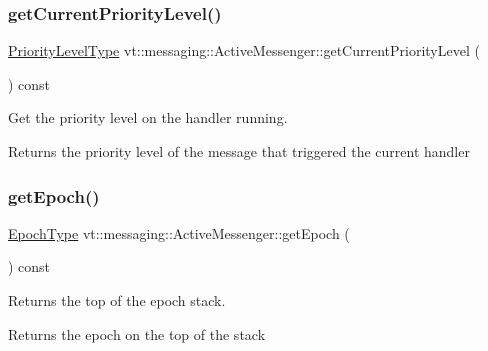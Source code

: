 \subsubsection{\texorpdfstring{get\+Current\+Priority\+Level()}{getCurrentPriorityLevel()}}
{\footnotesize\ttfamily \hyperlink{namespacevt_a53e07fdb3351b0f263e0dfd51b968d5e}{Priority\+Level\+Type} vt\+::messaging\+::\+Active\+Messenger\+::get\+Current\+Priority\+Level (\begin{DoxyParamCaption}{ }\end{DoxyParamCaption}) const}



Get the priority level on the handler running. 

\begin{DoxyReturn}{Returns}
the priority level of the message that triggered the current handler 
\end{DoxyReturn}
\mbox{\label{structvt_1_1messaging_1_1_active_messenger_a627a8b2918ad283edf386038cf5693ca}} 
\subsubsection{\texorpdfstring{get\+Epoch()}{getEpoch()}}
{\footnotesize\ttfamily \hyperlink{namespacevt_a985a5adf291c34a3ca263b3378388236}{Epoch\+Type} vt\+::messaging\+::\+Active\+Messenger\+::get\+Epoch (\begin{DoxyParamCaption}{ }\end{DoxyParamCaption}) const\hspace{0.3cm}{\ttfamily [inline]}}



Returns the top of the epoch stack. 

\begin{DoxyReturn}{Returns}
the epoch on the top of the stack 
\end{DoxyReturn}
\mbox{\label{structvt_1_1messaging_1_1_active_messenger_aa60710a2d4a1ac7fe60113fd8cbb9809}} 
